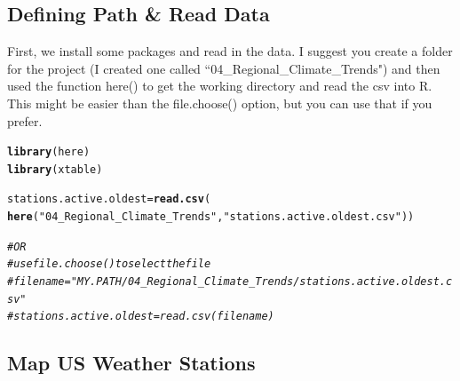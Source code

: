 \documentclass{article}\usepackage[]{graphicx}\usepackage[dvipsnames]{xcolor}
\makeatletter
\newcommand{\hlstr}[1]{\textcolor[rgb]{0.192,0.494,0.8}{#1}}%
\newcommand{\hlcom}[1]{\textcolor[rgb]{0.678,0.584,0.686}{\textit{#1}}}%
\newcommand{\hlstd}[1]{\textcolor[rgb]{0.345,0.345,0.345}{#1}}%
\newcommand{\hlkwb}[1]{\textcolor[rgb]{0.69,0.353,0.396}{#1}}%
\newcommand{\hlkwd}[1]{\textcolor[rgb]{0.737,0.353,0.396}{\textbf{#1}}}%
\newenvironment{kframe}{%
 \def\at@end@of@kframe{}%
 \ifinner\ifhmode%
  \def\at@end@of@kframe{\end{minipage}}%
  \begin{minipage}{\columnwidth}%
 \fi\fi%
 \def\FrameCommand##1{\hskip\@totalleftmargin \hskip-\fboxsep
 \colorbox{shadecolor}{##1}\hskip-\fboxsep
     \hskip-\linewidth \hskip-\@totalleftmargin \hskip\columnwidth}%
 \MakeFramed {\advance\hsize-\width
   \@totalleftmargin\z@ \linewidth\hsize
   \@setminipage}}%
 {\par\unskip\endMakeFramed%
 \at@end@of@kframe}
\newenvironment{knitrout}{}{} %
\makeatother
\begin{document}




\subsection{Defining Path \& Read Data}

First, we install some packages and read in the data. I suggest you create a folder for the project (I created one called ``04\_Regional\_Climate\_Trends") and then used the function here() to get the working directory and read the csv into R. This might be easier than the file.choose() option, but you can use that if you prefer.

\begin{knitrout}
\color{fgcolor}\begin{kframe}
\begin{alltt}
\hlkwd{library}\hlstd{(here)}
\hlkwd{library}\hlstd{(xtable)}

\hlstd{stations.active.oldest} \hlkwb{=} \hlkwd{read.csv}\hlstd{(}
  \hlkwd{here}\hlstd{(}\hlstr{"04_Regional_Climate_Trends"}\hlstd{,} \hlstr{"stations.active.oldest.csv"}\hlstd{))}

\hlcom{# OR}
\hlcom{# use file.choose() to select the file}
\hlcom{# filename = "MY.PATH/04_Regional_Climate_Trends/stations.active.oldest.csv"}
\hlcom{# stations.active.oldest = read.csv(filename)}
\end{alltt}
\end{kframe}
\end{knitrout}


\subsection{Map US Weather Stations}
\end{document}
